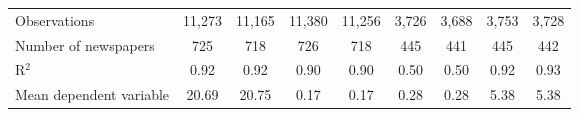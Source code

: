 {\begin{tabular}{l*{8}{c}}
\midrule
Observations        &      11,273         &      11,165         &      11,380         &      11,256         &       3,726         &       3,688         &       3,753         &       3,728         \\
Number of newspapers&         725         &         718         &         726         &         718         &         445         &         441         &         445         &         442         \\
R$^2$               &        0.92         &        0.92         &        0.90         &        0.90         &        0.50         &        0.50         &        0.92         &        0.93         \\
Mean dependent variable&       20.69         &       20.75         &        0.17         &        0.17         &        0.28         &        0.28         &        5.38         &        5.38         \\
\bottomrule
\end{tabular}
}
